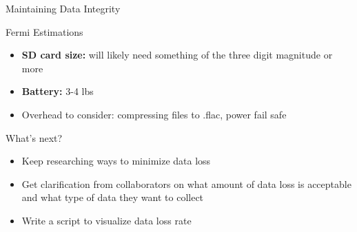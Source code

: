 \begin{frame}{Maintaining Data Integrity}
    \centering
\end{frame}

\begin{frame}{Fermi Estimations}
    \begin{itemize}
        \item \textbf{SD card size:} will likely need something of the three digit magnitude or more
        \item \textbf{Battery:} 3-4 lbs
        \item Overhead to consider: compressing files to .flac, power fail safe
    \end{itemize}
\end{frame}

\begin{frame}{What's next?}
    \begin{itemize}
        \item Keep researching ways to minimize data loss
        \item Get clarification from collaborators on what amount of data loss is acceptable and what type of data they want to collect
        \item Write a script to visualize data loss rate
    \end{itemize}
\end{frame}
